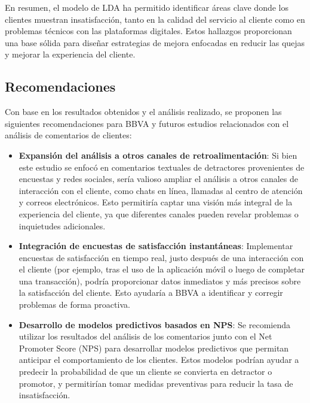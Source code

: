 \documentclass{matematicasud}
\begin{document}
En resumen, el modelo de LDA ha permitido identificar áreas clave donde los clientes muestran insatisfacción, tanto en la calidad del servicio al cliente como en problemas técnicos con las plataformas digitales. Estos hallazgos proporcionan una base sólida para diseñar estrategias de mejora enfocadas en reducir las quejas y mejorar la experiencia del cliente.

\subsection{Recomendaciones}

Con base en los resultados obtenidos y el análisis realizado, se proponen las siguientes recomendaciones para BBVA y futuros estudios relacionados con el análisis de comentarios de clientes:

\begin{itemize}

    \item \textbf{Expansión del análisis a otros canales de retroalimentación}: Si bien este estudio se enfocó en comentarios textuales de detractores provenientes de encuestas y redes sociales, sería valioso ampliar el análisis a otros canales de interacción con el cliente, como chats en línea, llamadas al centro de atención y correos electrónicos. Esto permitiría captar una visión más integral de la experiencia del cliente, ya que diferentes canales pueden revelar problemas o inquietudes adicionales.

    \item \textbf{Integración de encuestas de satisfacción instantáneas}: Implementar encuestas de satisfacción en tiempo real, justo después de una interacción con el cliente (por ejemplo, tras el uso de la aplicación móvil o luego de completar una transacción), podría proporcionar datos inmediatos y más precisos sobre la satisfacción del cliente. Esto ayudaría a BBVA a identificar y corregir problemas de forma proactiva.

    \item \textbf{Desarrollo de modelos predictivos basados en NPS}: Se recomienda utilizar los resultados del análisis de los comentarios junto con el Net Promoter Score (NPS) para desarrollar modelos predictivos que permitan anticipar el comportamiento de los clientes. Estos modelos podrían ayudar a predecir la probabilidad de que un cliente se convierta en detractor o promotor, y permitirían tomar medidas preventivas para reducir la tasa de insatisfacción.


\end{itemize}
\end{document}
